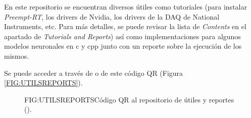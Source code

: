 
En este repositorio se encuentran diversos útiles como tutoriales (para instalar \textit{Preempt-RT}, los drivers de Nvidia, los drivers de la DAQ de National Instruments, etc. Para más detalles, se puede revisar la lista de \textit{Contents} en el apartado de \textit{Tutorials and Reports}) así como implementaciones para algunos modelos neuronales en c y cpp junto con un reporte sobre la ejecución de los mismos. 

Se puede acceder a través de  o de este código QR (Figura \ref{FIG:UTILSREPORTS}).

\begin{figure}[QR repositorio de útiles y reportes]{FIG:UTILSREPORTS}{Código QR al repositorio de útiles y reportes ().
}
\end{figure}
